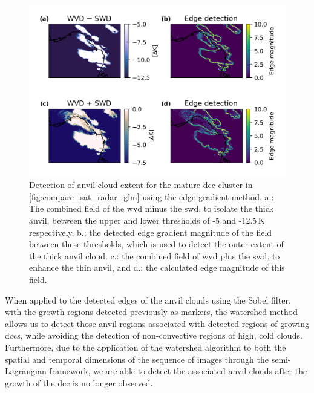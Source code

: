 \begin{figure}[tp]
    \includegraphics[width=\textwidth]{figures/chapter1_17.png}
    \caption[
    Detection of anvil cloud extent for the mature \acrshort{dcc} cluster in \ref{fig:compare_sat_radar_glm} using the edge gradient method
    ]{
    Detection of anvil cloud extent for the mature \acrshort{dcc} cluster in \ref{fig:compare_sat_radar_glm} using the edge gradient method. a.: The combined field of the \acrshort{wvd} minus the \acrshort{swd}, to isolate the thick anvil, between the upper and lower thresholds of -5 and -12.5\,\unit{K} respectively. b.: the detected edge gradient magnitude of the field between these thresholds, which is used to detect the outer extent of the thick anvil cloud. c.: the combined field of \acrshort{wvd} plus the \acrshort{swd}, to enhance the thin anvil, and d.: the calculated edge magnitude of this field.
    }
    \label{fig:edge_detection}
\end{figure}


When applied to the detected edges of the anvil clouds using the Sobel filter, with the growth regions detected previously as markers, the watershed method allows us to detect those anvil regions associated with detected regions of growing \acrshort{dcc}s, while avoiding the detection of non-convective regions of high, cold clouds.
Furthermore, due to the application of the watershed algorithm to both the spatial and temporal dimensions of the sequence of images through the semi-Lagrangian framework, we are able to detect the associated anvil clouds after the growth of the \acrshort{dcc} is no longer observed.


